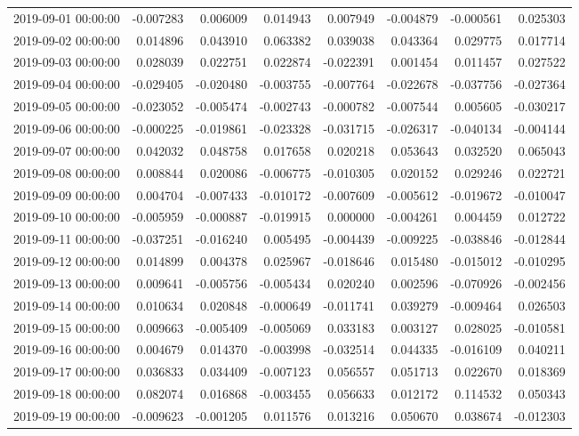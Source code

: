 \begin{tabular}{lrrrrrrr}
2019-09-01 00:00:00 & -0.007283 & 0.006009 & 0.014943 & 0.007949 & -0.004879 & -0.000561 & 0.025303 \\
2019-09-02 00:00:00 & 0.014896 & 0.043910 & 0.063382 & 0.039038 & 0.043364 & 0.029775 & 0.017714 \\
2019-09-03 00:00:00 & 0.028039 & 0.022751 & 0.022874 & -0.022391 & 0.001454 & 0.011457 & 0.027522 \\
2019-09-04 00:00:00 & -0.029405 & -0.020480 & -0.003755 & -0.007764 & -0.022678 & -0.037756 & -0.027364 \\
2019-09-05 00:00:00 & -0.023052 & -0.005474 & -0.002743 & -0.000782 & -0.007544 & 0.005605 & -0.030217 \\
2019-09-06 00:00:00 & -0.000225 & -0.019861 & -0.023328 & -0.031715 & -0.026317 & -0.040134 & -0.004144 \\
2019-09-07 00:00:00 & 0.042032 & 0.048758 & 0.017658 & 0.020218 & 0.053643 & 0.032520 & 0.065043 \\
2019-09-08 00:00:00 & 0.008844 & 0.020086 & -0.006775 & -0.010305 & 0.020152 & 0.029246 & 0.022721 \\
2019-09-09 00:00:00 & 0.004704 & -0.007433 & -0.010172 & -0.007609 & -0.005612 & -0.019672 & -0.010047 \\
2019-09-10 00:00:00 & -0.005959 & -0.000887 & -0.019915 & 0.000000 & -0.004261 & 0.004459 & 0.012722 \\
2019-09-11 00:00:00 & -0.037251 & -0.016240 & 0.005495 & -0.004439 & -0.009225 & -0.038846 & -0.012844 \\
2019-09-12 00:00:00 & 0.014899 & 0.004378 & 0.025967 & -0.018646 & 0.015480 & -0.015012 & -0.010295 \\
2019-09-13 00:00:00 & 0.009641 & -0.005756 & -0.005434 & 0.020240 & 0.002596 & -0.070926 & -0.002456 \\
2019-09-14 00:00:00 & 0.010634 & 0.020848 & -0.000649 & -0.011741 & 0.039279 & -0.009464 & 0.026503 \\
2019-09-15 00:00:00 & 0.009663 & -0.005409 & -0.005069 & 0.033183 & 0.003127 & 0.028025 & -0.010581 \\
2019-09-16 00:00:00 & 0.004679 & 0.014370 & -0.003998 & -0.032514 & 0.044335 & -0.016109 & 0.040211 \\
2019-09-17 00:00:00 & 0.036833 & 0.034409 & -0.007123 & 0.056557 & 0.051713 & 0.022670 & 0.018369 \\
2019-09-18 00:00:00 & 0.082074 & 0.016868 & -0.003455 & 0.056633 & 0.012172 & 0.114532 & 0.050343 \\
2019-09-19 00:00:00 & -0.009623 & -0.001205 & 0.011576 & 0.013216 & 0.050670 & 0.038674 & -0.012303 \\

\end{tabular}
